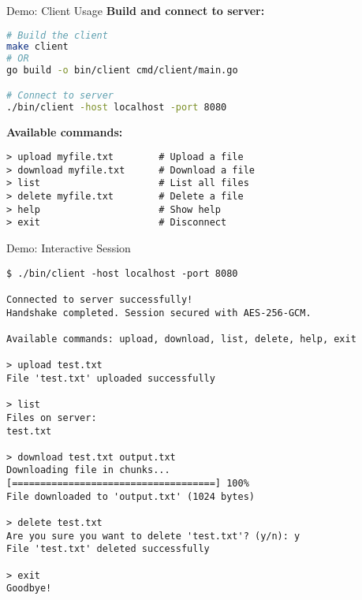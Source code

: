 \documentclass[aspectratio=169]{beamer}
\begin{document}
\begin{frame}[fragile]{Demo: Client Usage}
\textbf{Build and connect to server:}
\begin{lstlisting}[language=bash, basicstyle=\ttfamily\footnotesize]
# Build the client
make client
# OR
go build -o bin/client cmd/client/main.go

# Connect to server
./bin/client -host localhost -port 8080
\end{lstlisting}

\vspace{0.3cm}

\textbf{Available commands:}
\begin{lstlisting}[basicstyle=\ttfamily\footnotesize]
> upload myfile.txt        # Upload a file
> download myfile.txt      # Download a file
> list                     # List all files
> delete myfile.txt        # Delete a file
> help                     # Show help
> exit                     # Disconnect
\end{lstlisting}
\end{frame}

\begin{frame}[fragile]{Demo: Interactive Session}
\begin{lstlisting}[basicstyle=\ttfamily\tiny]
$ ./bin/client -host localhost -port 8080

Connected to server successfully!
Handshake completed. Session secured with AES-256-GCM.

Available commands: upload, download, list, delete, help, exit

> upload test.txt
File 'test.txt' uploaded successfully

> list
Files on server:
test.txt

> download test.txt output.txt
Downloading file in chunks...
[====================================] 100%
File downloaded to 'output.txt' (1024 bytes)

> delete test.txt
Are you sure you want to delete 'test.txt'? (y/n): y
File 'test.txt' deleted successfully

> exit
Goodbye!
\end{lstlisting}
\end{frame}
\end{document}
